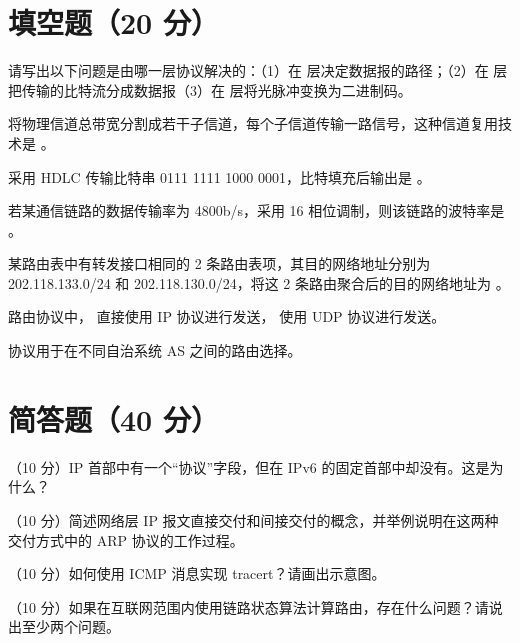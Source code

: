 \section{填空题（20 分）}
\begin{question}[index=1]
请写出以下问题是由哪一层协议解决的：（1）在 \underline{\hspace{3em}} 层决定数据报的路径；（2）在 \underline{\hspace{3em}} 层把传输的比特流分成数据报（3）在 \underline{\hspace{3em}} 层将光脉冲变换为二进制码。
\end{question}
\begin{question}[index=2]
将物理信道总带宽分割成若干子信道，每个子信道传输一路信号，这种信道复用技术是 \underline{\hspace{3em}}。
\end{question}
\begin{question}[index=3]
采用 HDLC 传输比特串 0111 1111 1000 0001，比特填充后输出是 \underline{\hspace{6em}}。
\end{question}
\begin{question}[index=4]
若某通信链路的数据传输率为 4800b/s，采用 16 相位调制，则该链路的波特率是 \underline{\hspace{4em}}。
\end{question}
\begin{question}[index=5]
某路由表中有转发接口相同的 2 条路由表项，其目的网络地址分别为 202.118.133.0/24 和 202.118.130.0/24，将这 2 条路由聚合后的目的网络地址为 \underline{\hspace{6em}}。
\end{question}
\begin{question}[index=6]
路由协议中，\underline{\hspace{4em}} 直接使用 IP 协议进行发送，\underline{\hspace{4em}} 使用 UDP 协议进行发送。
\end{question}
\begin{question}[index=7]
\underline{\hspace{4em}} 协议用于在不同自治系统 AS 之间的路由选择。
\end{question}
\section{简答题（40 分）}
\begin{question}[index=1]
（10 分）IP 首部中有一个“协议”字段，但在 IPv6 的固定首部中却没有。这是为什么？
\end{question}
\begin{question}[index=2]
（10 分）简述网络层 IP 报文直接交付和间接交付的概念，并举例说明在这两种交付方式中的 ARP 协议的工作过程。
\end{question}
\begin{question}[index=3]
（10 分）如何使用 ICMP 消息实现 tracert？请画出示意图。
\end{question}
\begin{question}[index=4]
（10 分）如果在互联网范围内使用链路状态算法计算路由，存在什么问题？请说出至少两个问题。
\end{question}
